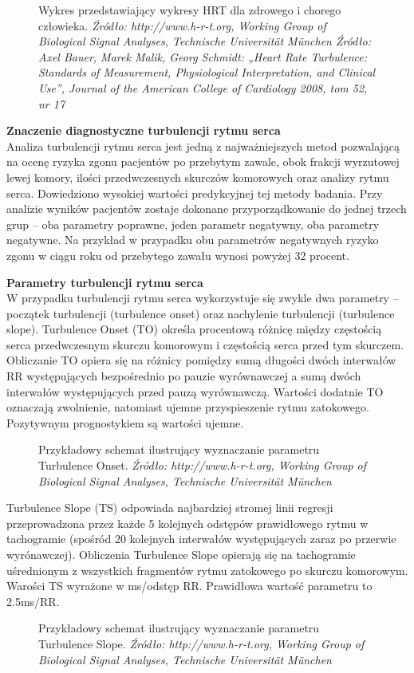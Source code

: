 \documentclass[a4paper, 11pt]{article}
\begin{document}
\begin{figure}[h!]
\centering
\caption{Wykres przedstawiający wykresy HRT dla zdrowego i chorego człowieka. 
\textit{Źródło: http://www.h-r-t.org, Working Group of Biological Signal Analyses, Technische Universität München Źródło: Axel Bauer, Marek Malik, Georg Schmidt: „Heart Rate Turbulence: Standards of Measurement, Physiological Interpretation, and Clinical Use”, Journal of the American College of Cardiology 2008, tom 52, nr 17} }
\end{figure}

\textbf{Znaczenie diagnostyczne turbulencji rytmu serca}\\
Analiza turbulencji rytmu serca jest jedną z najważniejszych metod pozwalającą na ocenę ryzyka zgonu pacjentów po przebytym zawale, obok frakcji wyrzutowej lewej komory, ilości przedwczesnych skurczów komorowych oraz analizy rytmu serca. Dowiedziono wysokiej wartości predykcyjnej tej metody badania.
Przy analizie wyników pacjentów zostaje dokonane przyporządkowanie do jednej trzech grup -- oba parametry poprawne, jeden parametr negatywny, oba parametry negatywne.
Na przykład w przypadku obu parametrów negatywnych ryzyko zgonu w ciągu roku od przebytego zawału wynosi powyżej 32 procent.

\textbf{Parametry turbulencji rytmu serca}\\
W przypadku turbulencji rytmu serca wykorzystuje się zwykle dwa parametry
-- początek turbulencji (turbulence onset) oraz nachylenie turbulencji (turbulence slope). Turbulence Onset (TO) określa procentową różnicę między częstością serca przedwczesnym skurczu komorowym i częstością serca przed tym skurczem. Obliczanie TO opiera się na różnicy pomiędzy sumą długości dwóch interwałów RR występujących bezpośrednio po pauzie wyrównawczej a sumą dwóch interwałów występujących przed pauzą wyrównawczą.
Wartości dodatnie TO oznaczają zwolnienie, natomiast ujemne przyspieszenie rytmu zatokowego. Pozytywnym prognostykiem są wartości ujemne.

\begin{figure}[h!]
\centering
\caption{Przykładowy schemat ilustrujący wyznaczanie parametru Turbulence Onset.
\textit{ Źródło: http://www.h-r-t.org, Working Group of Biological Signal Analyses, Technische Universität München} }
\end{figure}
\par Turbulence Slope (TS) odpowiada najbardziej stromej linii regresji przeprowadzona przez każde 5 kolejnych odstępów prawidłowego rytmu w tachogramie (spośród 20 kolejnych interwałów występujących zaraz po przerwie wyrónawczej). Obliczenia Turbulence Slope opierają się na tachogramie uśrednionym z wszystkich fragmentów rytmu zatokowego po skurczu komorowym. Warości TS wyrażone w ms/odstęp RR. Prawidłowa wartość parametru to 2.5ms/RR.
\begin{figure}[h!]
\centering
\caption{Przykładowy schemat ilustrujący wyznaczanie parametru Turbulence Slope.
\textit{ Źródło: http://www.h-r-t.org, Working Group of Biological Signal Analyses, Technische Universität München} }
\end{figure}
\newpage
\end{document}
